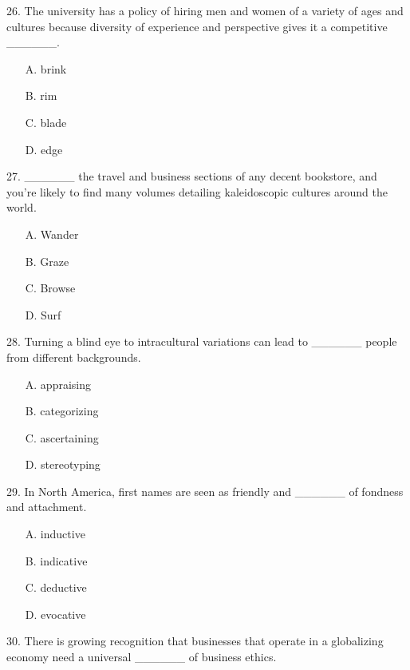 \documentclass[UTF8,11pt]{ctexart}
\begin{document}
26. The university has a policy of hiring men and women of a variety of ages and cultures because diversity of experience and perspective gives it a competitive \_\_\_\_\_\_.


\begin{itemize}[leftmargin=2em,itemsep=.2em,topsep=.4em]\item[A.] brink
\item[B.] rim
\item[C.] blade
\item[D.] edge
\end{itemize}

27. \_\_\_\_\_\_ the travel and business sections of any decent bookstore, and you’re likely to find many volumes detailing kaleidoscopic cultures around the world.


\begin{itemize}[leftmargin=2em,itemsep=.2em,topsep=.4em]\item[A.] Wander
\item[B.] Graze
\item[C.] Browse
\item[D.] Surf
\end{itemize}

28. Turning a blind eye to intracultural variations can lead to \_\_\_\_\_\_ people from different backgrounds.


\begin{itemize}[leftmargin=2em,itemsep=.2em,topsep=.4em]\item[A.] appraising
\item[B.] categorizing
\item[C.] ascertaining
\item[D.] stereotyping
\end{itemize}

29. In North America, first names are seen as friendly and \_\_\_\_\_\_ of fondness and attachment.


\begin{itemize}[leftmargin=2em,itemsep=.2em,topsep=.4em]\item[A.] inductive
\item[B.] indicative
\item[C.] deductive
\item[D.] evocative
\end{itemize}

30. There is growing recognition that businesses that operate in a globalizing economy need a universal \_\_\_\_\_\_ of business ethics.
\end{document}
